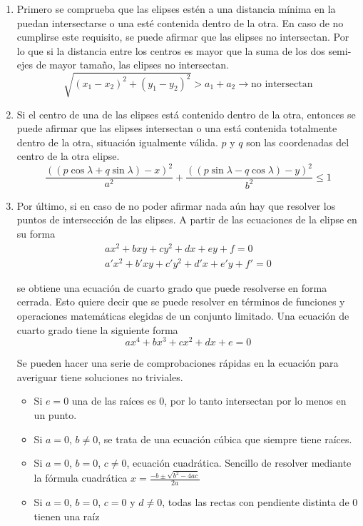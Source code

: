 \begin{enumerate}

\item Primero se comprueba que las elipses estén a una distancia mínima en la puedan intersectarse o una esté contenida dentro de la otra. En caso de no cumplirse este requisito, se puede afirmar que las elipses no intersectan. Por lo que si la distancia entre los centros es mayor que la suma de los dos semi-ejes de mayor tamaño, las elipses no intersectan.
\begin{equation}
  \sqrt{ (x_1 - x_2)^2 + (y_1 - y_2)^2 } > a_1 + a_2 \rightarrow \text{no intersectan}
\end{equation}

\item Si el centro de una de las elipses está contenido dentro de la otra, entonces se puede afirmar que las elipses intersectan o una está contenida totalmente dentro de la otra, situación igualmente válida. $p$ y $q$ son las coordenadas del centro de la otra elipse.
\begin{equation}
  \frac{ ((p \cos \lambda + q \sin \lambda ) - x)^2 }{ a^2 } + 
  \frac{ ((p \sin \lambda - q \cos \lambda ) - y)^2 }{ b^2 } \leq 1
\end{equation}

\item Por último, si en caso de no poder afirmar nada aún hay que resolver los puntos de intersección de las elipses. A partir de las ecuaciones de la elipse en su forma
\begin{equation}
  \begin{split}
  ax^2  + bxy  + cy^2  + dx  + ey  + f = 0 \\
  a'x^2 + b'xy + c'y^2 + d'x + e'y + f' = 0    
  \end{split}
\end{equation}

se obtiene una ecuación de cuarto grado que puede resolverse en forma cerrada. Esto quiere decir que se puede resolver en términos de funciones y operaciones matemáticas elegidas de un conjunto limitado. Una ecuación de cuarto grado tiene la siguiente forma
\begin{equation}
  ax^4 + bx^3 + cx^2 + dx + e = 0
\end{equation}

Se pueden hacer una serie de comprobaciones rápidas en la ecuación para averiguar tiene soluciones no triviales.
\begin{itemize}
\item Si $e = 0$ una de las raíces es $0$, por lo tanto intersectan por lo menos en un punto.
\item Si $a=0$, $b \neq 0$, se trata de una ecuación cúbica que siempre tiene raíces.
\item Si $a=0$, $b=0$, $c \neq 0$, ecuación cuadrática. Sencillo de resolver mediante la fórmula cuadrática $x=\frac{-b \pm \sqrt{b^2 - 4ac}}{2a}$
\item Si $a=0$, $b=0$, $c=0$ y $d \neq 0$, todas las rectas con pendiente distinta de 0 tienen una raíz
\end{itemize}


\end{enumerate}
